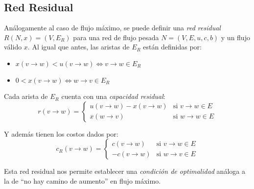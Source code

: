 \documentclass[a4paper]{report}
\newcommand{\si}{\text{si }}
\begin{document}
\subsection{Red Residual}

Análogamente al caso de flujo máximo, se puede definir una \textit{red residual} $R(N, x) = (V, E_R)$ para una red de flujo pesada $N = (V, E, u, c, b)$ y un flujo válido $x$. Al igual que antes, las aristas de $E_R$ están definidas por:
\begin{itemize}
    \item $x(v \rightarrow w) < u(v \rightarrow w) \iff v \rightarrow w \in E_R$
    \item $0 < x(v \rightarrow w) \iff w \rightarrow v \in E_R$
\end{itemize}

Cada arista de $E_R$ cuenta con una \textit{capacidad residual}:
$$
    r(v \rightarrow w) =
    \begin{cases}
        u(v \rightarrow w) - x(v \rightarrow w) & \si v \rightarrow w \in E \\
        x(w \rightarrow v)                      & \si w \rightarrow w \in E
    \end{cases}
$$

Y además tienen los costos dados por:
$$
    c_R(v \rightarrow w) =
    \begin{cases}
        c(v \rightarrow w)  & \si v \rightarrow w \in E \\
        -c(v \rightarrow w) & \si w \rightarrow v \in E
    \end{cases}
$$

Esta red residual nos permite establecer una \textit{condición de optimalidad} análoga a la de ``no hay camino de aumento'' en flujo máximo.
\end{document}
